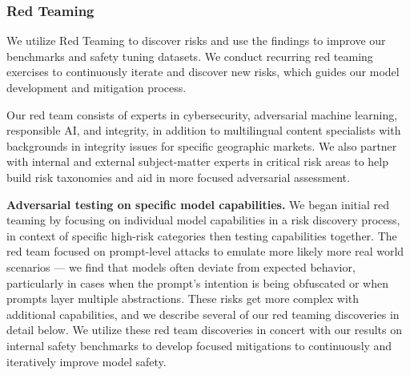 \subsubsection{Red Teaming}
\label{section:red_teaming}

We utilize Red Teaming to discover risks and use the findings to improve our benchmarks and safety tuning datasets. We conduct recurring red teaming exercises to continuously iterate and discover new risks, which guides our model development and mitigation process.

Our red team consists of experts in cybersecurity, adversarial machine learning, responsible AI, and integrity, in addition to multilingual content specialists with backgrounds in integrity issues for specific geographic markets. We also partner with internal and external subject-matter experts in critical risk areas to help build risk taxonomies and aid in more focused adversarial assessment.

\textbf{Adversarial testing on specific model capabilities.} We began initial red teaming by focusing on individual model capabilities in a risk discovery process, in context of specific high-risk categories then testing capabilities together. The red team focused on prompt-level attacks to emulate more likely more real world scenarios --- we find that models often deviate from expected behavior, particularly in cases when the prompt's intention is being obfuscated or when prompts layer multiple abstractions. These risks get more complex with additional capabilities, and we describe several of our red teaming discoveries in detail below. We utilize these red team discoveries in concert with our results on internal safety benchmarks to develop focused mitigations to continuously and iteratively improve model safety.

